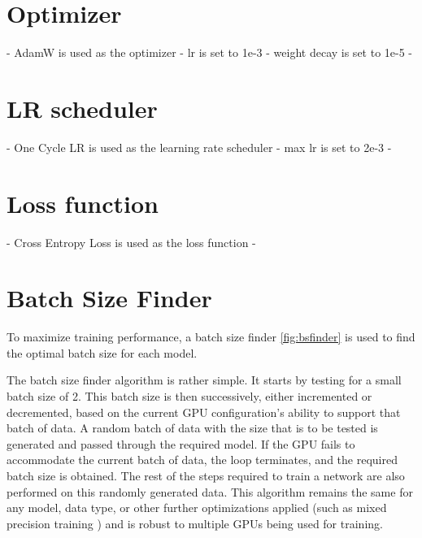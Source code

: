 \section{Optimizer}
- AdamW is used as the optimizer
- lr is set to 1e-3
- weight decay is set to 1e-5
- 

\section{LR scheduler}
- One Cycle LR is used as the learning rate scheduler
- max lr is set to 2e-3
- 

\section{Loss function}
- Cross Entropy Loss is used as the loss function
- 

\section{Batch Size Finder}
To maximize training performance, a batch size finder \ref{fig:bsfinder} is used to find the optimal batch size for each model.

The batch size finder algorithm is rather simple. It starts by testing for a small batch size of 2. This batch size is then successively, either incremented or decremented, based on the current GPU configuration's ability to support that batch of data.
A random batch of data with the size that is to be tested is generated and passed through the required model. If the GPU fails to accommodate the current batch of data, the loop terminates, and the required batch size is obtained. The rest of the steps required to train a network are also performed on this randomly generated data.
This algorithm remains the same for any model, data type, or other further optimizations applied (such as mixed precision training \cite{micikeviciusMixedPrecisionTraining2017}) and is robust to multiple GPUs being used for training.

